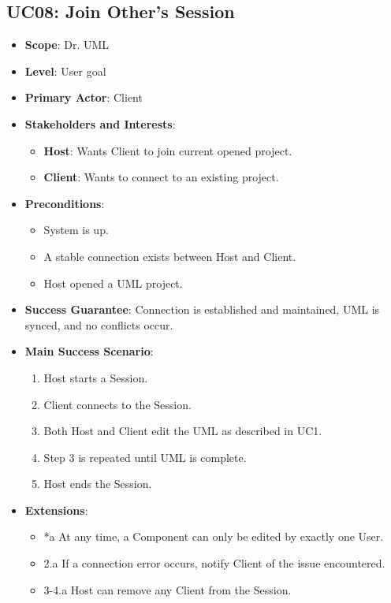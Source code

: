 \documentclass[12pt]{article}
\begin{document}
\subsection{UC08: Join Other's Session}
\begin{itemize}
    \item \textbf{Scope}: Dr. UML
    \item \textbf{Level}: User goal
    \item \textbf{Primary Actor}: Client
    \item \textbf{Stakeholders and Interests}:
    \begin{itemize}
        \item \textbf{Host}: Wants Client to join current opened project.
        \item \textbf{Client}: Wants to connect to an existing project.
    \end{itemize}
    \item \textbf{Preconditions}:
    \begin{itemize}
        \item System is up.
        \item A stable connection exists between Host and Client.
        \item Host opened a UML project.
    \end{itemize}
    \item \textbf{Success Guarantee}: Connection is established and maintained, UML is synced, and no conflicts occur.
    \item \textbf{Main Success Scenario}:
    \begin{enumerate}
        \item Host starts a Session.
        \item Client connects to the Session.
        \item Both Host and Client edit the UML as described in UC1.
        \item Step 3 is repeated until UML is complete.
        \item Host ends the Session.
    \end{enumerate}
    \item \textbf{Extensions}:
    \begin{itemize}
        \item *a At any time, a Component can only be edited by exactly one User.
        \item 2.a If a connection error occurs, notify Client of the issue encountered.
        \item 3-4.a Host can remove any Client from the Session.

\end{itemize}
\end{itemize}
\end{document}
